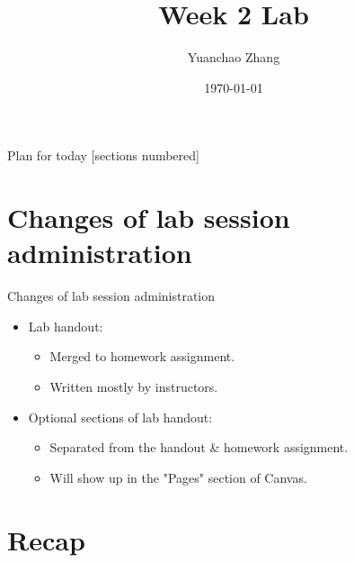 \documentclass[12pt, t, xcolor=dvipsnames]{beamer}
\title{Week 2 Lab}
\date{\today}
\author{Yuanchao Zhang}
\begin{document}
\maketitle

\begin{frame}{Plan for today}
  [sections numbered]
  \tableofcontents[hideallsubsections]
\end{frame}


\section{Changes of lab session administration}

\begin{frame}{Changes of lab session administration}
  \begin{itemize}
    \item Lab handout:
    \begin{itemize}
       \item Merged to homework assignment.
       \item Written mostly by instructors.
     \end{itemize}
    \item Optional sections of lab handout:
    \begin{itemize}
       \item Separated from the handout \& homework assignment.
       \item Will show up in the "\alert{Pages}" section of Canvas.
     \end{itemize}
  \end{itemize}
\end{frame}

\section{Recap}
\end{document}
